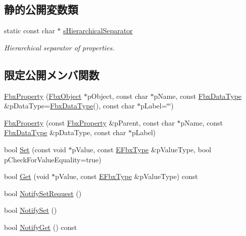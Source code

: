 \subsection*{静的公開変数類}
\begin{DoxyCompactItemize}
\item 
static const char $\ast$ \hyperlink{class_fbx_property_a4b55a5fb0b5e63c3db166e64f38bec1d}{s\+Hierarchical\+Separator}
\begin{DoxyCompactList}\small\item\em Hierarchical separator of properties. \end{DoxyCompactList}\end{DoxyCompactItemize}
\subsection*{限定公開メンバ関数}
\begin{DoxyCompactItemize}
\item 
\hyperlink{class_fbx_property_aa9bd3c13031aeb1035adfb3e37256ce4}{Fbx\+Property} (\hyperlink{class_fbx_object}{Fbx\+Object} $\ast$p\+Object, const char $\ast$p\+Name, const \hyperlink{class_fbx_data_type}{Fbx\+Data\+Type} \&p\+Data\+Type=\hyperlink{class_fbx_data_type}{Fbx\+Data\+Type}(), const char $\ast$p\+Label=\char`\"{}\char`\"{})
\item 
\hyperlink{class_fbx_property_a019739c19f5652349afb9780945e57f0}{Fbx\+Property} (const \hyperlink{class_fbx_property}{Fbx\+Property} \&p\+Parent, const char $\ast$p\+Name, const \hyperlink{class_fbx_data_type}{Fbx\+Data\+Type} \&p\+Data\+Type, const char $\ast$p\+Label)
\item 
bool \hyperlink{class_fbx_property_aa89d91b8bf335921748ea21ab08eb9a3}{Set} (const void $\ast$p\+Value, const \hyperlink{fbxpropertytypes_8h_a73913a5ddfb20e57c6f25e9e6784bd92}{E\+Fbx\+Type} \&p\+Value\+Type, bool p\+Check\+For\+Value\+Equality=true)
\item 
bool \hyperlink{class_fbx_property_ac2b8fdea0758676644547365cea1e2ae}{Get} (void $\ast$p\+Value, const \hyperlink{fbxpropertytypes_8h_a73913a5ddfb20e57c6f25e9e6784bd92}{E\+Fbx\+Type} \&p\+Value\+Type) const
\item 
bool \hyperlink{class_fbx_property_afb12acf8aeec609f4df77c61e5346e59}{Notify\+Set\+Request} ()
\item 
bool \hyperlink{class_fbx_property_ac2a6a7d8711567294c90f37791846331}{Notify\+Set} ()
\item 
bool \hyperlink{class_fbx_property_abbb2f1f50f22fbcd94ad56e3373efaac}{Notify\+Get} () const
\end{DoxyCompactItemize}
